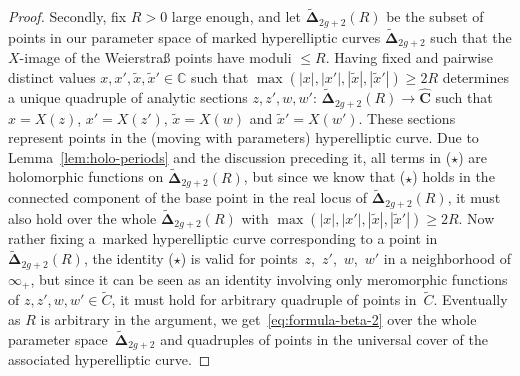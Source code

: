 \documentclass[10pt,a4paper]{amsart}
\numberwithin{equation}{section}
\begin{document}
\begin{proof}
Secondly, fix $R > 0$ large enough, and let $\widetilde{\bm{\Delta}}_{2g + 2}(R)$ be the subset of points in our para\-meter space of marked hyperelliptic curves $\widetilde{\bm{\Delta}}_{2g + 2}$ such that the $X$-image of the Weierstra\ss{} points have moduli $\leq R$. Having fixed and pairwise distinct values $x,x',\tilde{x},\tilde{x}' \in \mathbb{C}$ such that $\max(|x|,|x'|,|\tilde{x}|,|\tilde{x}'|) \geq 2R$ determines a unique quadruple of analytic sections $z,z',w,w'$: $\widetilde{\bm{\Delta}}_{2g + 2}(R) \rightarrow \hat{\bm{C}}$ such that $x = X(z)$, $x' = X(z')$, $\tilde{x} = X(w)$ and $\tilde{x}' = X(w')$. These sections represent points in the (moving with parameters) hyperelliptic curve. Due to Lemma~\ref{lem:holo-periods} and the discussion preceding it, all terms in ($\star$) are holomorphic functions on $\widetilde{\bm{\Delta}}_{2g + 2}(R)$, but since we know that ($\star$) holds in the connected component of the base point in the real locus of $\widetilde{\bm{\Delta}}_{2g + 2}(R)$, it must also hold over the whole $\widetilde{\bm{\Delta}}_{2g + 2}(R)$ with $\max(|x|,|x'|,|\tilde{x}|,|\tilde{x}'|) \geq 2R$. Now rather fixing a~marked hyperelliptic curve corresponding to a point in $\widetilde{\bm{\Delta}}_{2g + 2}(R)$, the identity ($\star$) is valid for points~$z$,~$z'$,~$w$,~$w'$ in a neighborhood of $\infty_+$, but since it can be seen as an identity involving only meromorphic functions of $z,z',w,w' \in \widetilde{C}$, it must hold for arbitrary quadruple of points in~$\widetilde{C}$. Eventually as $R$ is arbitrary in the argument, we get~\eqref{eq:formula-beta-2} over the whole parameter space~$\widetilde{\bm{\Delta}}_{2g + 2}$ and quadruples of points in the universal cover of the associated hyperelliptic curve.
\end{proof}
\end{document}
